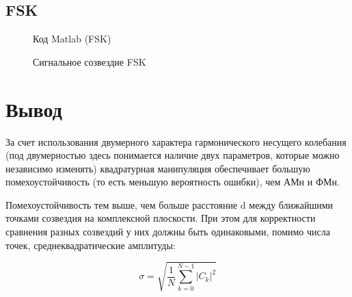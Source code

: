 \documentclass[12pt,a4paper]{scrartcl}
\begin{document}
\subsection{FSK}
\label{sec:FSK}
\begin{figure}[h!]
\caption{Код Matlab (FSK)}
\end{figure}

\begin{figure}[h!]
\caption{Сигнальное созвездие FSK}
\end{figure}


\clearpage
\newpage

\section{Вывод}
\label{sec:afterWork}
За счет использования двумерного характера гармонического несущего колебания (под двумерностью здесь понимается наличие двух параметров, которые можно независимо изменять) квадратурная манипуляция обеспечивает большую помехоустойчивость (то есть меньшую вероятность ошибки), чем АМн и ФМн.

Помехоустойчивость тем выше, чем больше расстояние d между ближайшими точками созвездия на комплексной плоскости. При этом для корректности сравнения разных созвездий у них должны быть одинаковыми, помимо числа точек, среднеквадратические амплитуды:

$$\sigma=\sqrt{\frac{1}{N}\sum_{k=0}^{N-1}|C_k|^2}$$
\end{document}
